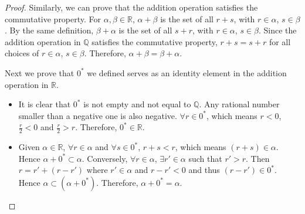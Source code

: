 \documentclass[onecolumn]{article}
\begin{document}
\begin{proof}
  Similarly, we can prove that the addition operation satisfies the commutative 
  property. For $\alpha, \beta \in \mathbb{R}$, $\alpha + \beta$ is the set of 
  all $r + s$, with $r \in \alpha$, $s \in \beta$. By the same definition, 
  $\beta + \alpha$ is the set of all $s + r$, with $r \in \alpha$, $s \in \beta$. 
  Since the addition operation in $\mathbb{Q}$ satisfies the commutative 
  property, $r + s = s + r$ for all choices of $r \in \alpha$, $s \in \beta$. 
  Therefore, $\alpha + \beta = \beta + \alpha$.

  Next we prove that $0^*$ we defined serves as an identity element in the 
  addition operation in $\mathbb{R}$.
  \begin{itemize}
    \item It is clear that $0^*$ is not empty and not equal to $\mathbb{Q}$. Any 
    rational number smaller than a negative one is also negative. 
    $\forall r \in 0^*$, which means $r < 0$, $\frac{r}{2} < 0$ and 
    $\frac{r}{2} > r$. Therefore, $0^* \in \mathbb{R}$.
    \item Given $\alpha \in \mathbb{R}$, $\forall r \in \alpha$ and 
    $\forall s \in 0^*$, $r + s < r$, which means $(r + s) \in \alpha$. Hence 
    $\alpha + 0^* \subset \alpha$. Conversely, $\forall r \in \alpha$, 
    $\exists r' \in \alpha$ such that $r' > r$. Then $r = r' + (r - r')$ where 
    $r' \in \alpha$ and $r - r' < 0$ and thus $(r - r') \in 0^*$. Hence 
    $\alpha \subset (\alpha + 0^*)$. Therefore, $\alpha + 0^* = \alpha$.
  \end{itemize}


\end{proof}
\end{document}
